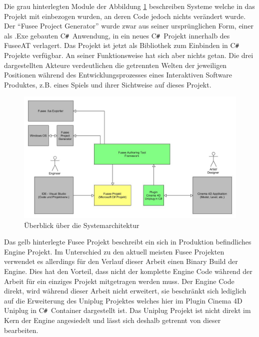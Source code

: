 \documentclass[pagesize, paper=a4, fontsize=12pt, titlepage=true, headings=small, headnosepline, abstractoff, liststotoc, nochapterprefix, plainheadsepline, twoside]{scrreprt}
\newcommand{\CSS}{C\texttt{\# }}
\begin{document}
Die grau hinterlegten Module der Abbildung \ref{FuseeATSystemÜberblick} beschreiben Systeme welche in das Projekt mit einbezogen wurden, an deren Code jedoch nichts verändert wurde. Der “Fusee Project Generator” wurde zwar aus seiner ursprünglichen Form, einer als .Exe gebauten \CSS Anwendung, in ein neues \CSS Projekt innerhalb des FuseeAT verlagert. Das Projekt ist jetzt als Bibliothek zum Einbinden in \CSS Projekte verfügbar. An seiner Funktionsweise hat sich aber nichts getan. Die drei dargestellten Akteure verdeutlichen die getrennten Welten der jeweiligen Positionen während des Entwicklungsprozesses eines Interaktiven Software Produktes, z.B. eines Spiels und ihrer Sichtweise auf dieses Projekt.
\begin{figure}[ht]
	\centering
	\includegraphics[width=\linewidth]{Bilder/Ueberblick_System.jpg}
	\caption{Überblick über die Systemarchitektur}
	\label{FuseeATSystemÜberblick}
\end{figure}
Das gelb hinterlegte Fusee Projekt beschreibt ein sich in Produktion befindliches Engine Projekt. Im Unterschied zu den aktuell meisten Fusee Projekten verwendet es allerdings für den Verlauf dieser Arbeit einen Binary Build der Engine. Dies hat den Vorteil, dass nicht der komplette Engine Code während der Arbeit für ein einziges Projekt mitgetragen werden muss. Der Engine Code direkt, wird während dieser Arbeit nicht erweitert, sie beschränkt sich lediglich auf die Erweiterung des Uniplug Projektes welches hier im Plugin Cinema 4D Uniplug in \CSS Container dargestellt ist. Das Uniplug Projekt ist nicht direkt im Kern der Engine angesiedelt und lässt sich deshalb getrennt von dieser bearbeiten.
\\
\end{document}
